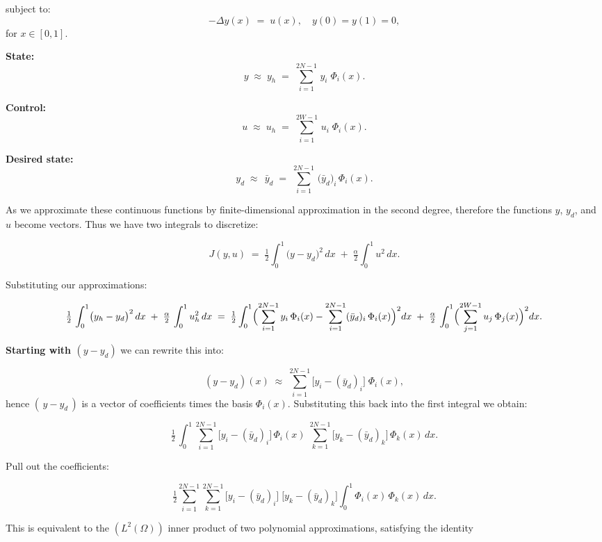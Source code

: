 \documentclass[a4paper,10pt]{article}
\begin{document}
\noindent
subject to:
\[
-\Delta y(x)\;=\;u(x),\quad y(0)=y(1)=0,
\]
\noindent
for $x\in[0,1]$.

\bigskip

\noindent
\textbf{State:} 
\[
y \;\approx\; y_{h}
\;=\;
\sum_{i=1}^{2N-1}\,y_{i}\;\Phi_{i}(x).
\]

\noindent
\textbf{Control:} 
\[
u \;\approx\; u_{h}
\;=\;
\sum_{i=1}^{2W-1}\,u_{i}\;\Phi_{i}(x).
\]

\noindent
\textbf{Desired state:}
\[
y_{d}\;\approx\;\,\bar{y}_{d}
\;=\;
\sum_{i=1}^{2N-1}\,\bigl(\bar{y}_{d}\bigr)_{i}\,\Phi_{i}(x).
\]

\noindent
As we approximate these continuous functions by finite-dimensional approximation in the second degree,
therefore the functions $y$, $y_{d}$, and $u$ become vectors. Thus we have two integrals to discretize:

\[
J(y,u)
\;=\;
\tfrac12\int_{0}^{1}\bigl(y - y_{d}\bigr)^{2}\,dx
\;+\;
\tfrac{\alpha}{2}\int_{0}^{1}u^{2}\,dx.
\]

\noindent
Substituting our approximations:

\[
\tfrac12\,\int_{0}^{1}\bigl(y_{h}-y_{d}\bigr)^{2}\,dx
\;+\;
\tfrac{\alpha}{2}\,\int_{0}^{1}u_{h}^{2}\,dx
\;=\;
\tfrac12 \int_{0}^{1}
\Bigl(\sum_{i=1}^{2N-1}y_{i}\,\Phi_{i}(x)
-
\sum_{i=1}^{2N-1}(\bar{y}_{d})_{i}\,\Phi_{i}(x)\Bigr)^{2}
dx
\;+\;
\tfrac{\alpha}{2}\,\int_{0}^{1}
\Bigl(\sum_{j=1}^{2W-1}u_{j}\,\Phi_{j}(x)\Bigr)^{2}dx.
\]

\bigskip

\noindent
\textbf{Starting with $(y-y_{d})$} we can rewrite this into:

\[
(y - y_{d})(x)
\;\approx\;
\sum_{i=1}^{2N-1}\bigl[y_{i} - (\bar{y}_{d})_{i}\bigr]\;\Phi_{i}(x),
\]
hence $(\,y - y_{d}\,)$ is a vector of coefficients times the basis $\Phi_{i}(x)$. Substituting this back into
the first integral we obtain:

\[
\tfrac12\,\int_{0}^{1}
\sum_{i=1}^{2N-1}\bigl[y_{i} - (\bar{y}_{d})_{i}\bigr]\,\Phi_{i}(x)
\;\sum_{k=1}^{2N-1}\bigl[y_{k} - (\bar{y}_{d})_{k}\bigr]\,\Phi_{k}(x)\,dx.
\]

\noindent
Pull out the coefficients:

\[
\tfrac12
\sum_{i=1}^{2N-1}\sum_{k=1}^{2N-1}
\bigl[y_{i} - (\bar{y}_{d})_{i}\bigr]\;\bigl[y_{k} - (\bar{y}_{d})_{k}\bigr]
\int_{0}^{1}\Phi_{i}(x)\,\Phi_{k}(x)\,dx.
\]

\noindent
This is equivalent to the $(L^2(\Omega))$ inner product of two polynomial approximations, satisfying the identity
\end{document}
